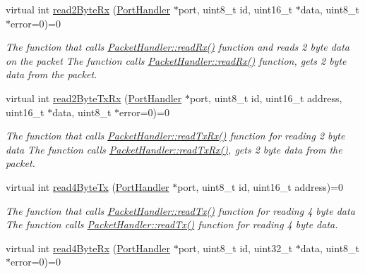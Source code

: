 \begin{DoxyCompactItemize}
virtual int \hyperlink{classmercury_1_1_packet_handler_a31cd98b259f0732baf1791014f2eed85}{read2\+Byte\+Rx} (\hyperlink{classmercury_1_1_port_handler}{Port\+Handler} $\ast$port, uint8\+\_\+t id, uint16\+\_\+t $\ast$data, uint8\+\_\+t $\ast$error=0)=0
\begin{DoxyCompactList}\small\item\em The function that calls \hyperlink{classmercury_1_1_packet_handler_a0857bd487c48ea83fc2b93e1e3e80200}{Packet\+Handler\+::read\+Rx()} function and reads 2 byte data on the packet  The function calls \hyperlink{classmercury_1_1_packet_handler_a0857bd487c48ea83fc2b93e1e3e80200}{Packet\+Handler\+::read\+Rx()} function,  gets 2 byte data from the packet. \end{DoxyCompactList}\item 
virtual int \hyperlink{classmercury_1_1_packet_handler_aed1867891e008664d21eaa1280551323}{read2\+Byte\+Tx\+Rx} (\hyperlink{classmercury_1_1_port_handler}{Port\+Handler} $\ast$port, uint8\+\_\+t id, uint16\+\_\+t address, uint16\+\_\+t $\ast$data, uint8\+\_\+t $\ast$error=0)=0
\begin{DoxyCompactList}\small\item\em The function that calls \hyperlink{classmercury_1_1_packet_handler_ac743a57bba9e71aadb1578f0e704f166}{Packet\+Handler\+::read\+Tx\+Rx()} function for reading 2 byte data  The function calls \hyperlink{classmercury_1_1_packet_handler_ac743a57bba9e71aadb1578f0e704f166}{Packet\+Handler\+::read\+Tx\+Rx()},  gets 2 byte data from the packet. \end{DoxyCompactList}\item 
virtual int \hyperlink{classmercury_1_1_packet_handler_a636053184fc047cbf93dd3865b8790f4}{read4\+Byte\+Tx} (\hyperlink{classmercury_1_1_port_handler}{Port\+Handler} $\ast$port, uint8\+\_\+t id, uint16\+\_\+t address)=0
\begin{DoxyCompactList}\small\item\em The function that calls \hyperlink{classmercury_1_1_packet_handler_a58220a79dcdff959241bd5688e6dbb1a}{Packet\+Handler\+::read\+Tx()} function for reading 4 byte data  The function calls \hyperlink{classmercury_1_1_packet_handler_a58220a79dcdff959241bd5688e6dbb1a}{Packet\+Handler\+::read\+Tx()} function for reading 4 byte data. \end{DoxyCompactList}\item 
virtual int \hyperlink{classmercury_1_1_packet_handler_a0f590b9cefb32d8b6b00f9ba4f3f37a7}{read4\+Byte\+Rx} (\hyperlink{classmercury_1_1_port_handler}{Port\+Handler} $\ast$port, uint8\+\_\+t id, uint32\+\_\+t $\ast$data, uint8\+\_\+t $\ast$error=0)=0

\end{DoxyCompactItemize}
